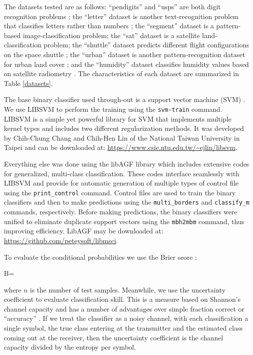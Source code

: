 The datasets tested are as follows: 
``pendigits'' and ``usps'' are both digit recognition problems 
\citep{Alimoglu1996,Hull1994};
the ``letter'' dataset is another text-recognition problem 
that classifies letters rather than numbers 
\citep{Frey_Slate1991};
the ``segment'' dataset is a pattern-based image-classification problem;
the ``sat'' dataset is a satellite land-classification problem;
the ``shuttle'' dataset predicts different flight configurations on the
space shuttle \citep{Michie_etal1994,King_etal1995};
the ``urban'' dataset is another pattern-recognition dataset for urban land cover
\citep{Johnson2013};
and the ``humidity'' dataset classifies humidity values based on satellite
radiometry \citep{Mills2009}.
The characteristics of each dataset are summarized in Table \ref{datasets}.

The base binary classifier used through-out is a 
support vector machine (SVM) \citep{Mueller_etal2001}.
We use LIBSVM \citep{Chang_Lin2011} to perform the training
using the \verb/svm-train/ command.
LIBSVM is a simple yet powerful library for SVM that implements multiple
kernel types and includes two different regularization methods.
It was developed by Chih-Chung Chang and Chih-Hen Lin of the National
Taiwan University in Taipei
and can be downloaded at: \url{https://www.csie.ntu.edu.tw/~cjlin/libsvm}.

Everything else was done using the libAGF library \citep{Mills2011,Mills2018}
which includes extensive codes for generalized, multi-class classification.
These codes interface seamlessly with LIBSVM and provide for automatic
generation of multiple types of control file using the \verb/print_control/
command.
Control files are used to train the binary classifiers and then
to make predictions using the \verb/multi_borders/ and \verb/classify_m/
commands, respectively.
Before making predictions, the binary classifiers were unified to eliminate
duplicate support vectors using the \verb/mbh2mbm/ command, thus improving
efficiency.
LibAGF may be downloaded at: \url{https://github.com/peteysoft/libmsci}.

To evaluate the conditional probabilities we use the Brier score
\citep{Brier1950,Jolliffe_Stephenson2003}:
\begin{eqnnon}
B=
\end{eqnnon}
where $n$ is the number of test samples.
Meanwhile, we use the uncertainty coefficient to evaluate classification skill.
This is a measure based on Shannon's channel capacity \citep{Shannon} and
has a number of advantages over simple fraction correct or ``accuracy''
\citep{Press_etal1992,Mills2011}.
If we treat the classifier as a noisy channel, with each classification a
single symbol, the true class entering at the transmitter and the estimated
class coming out at the receiver,
then the uncertainty coefficient is the channel capacity divided by the
entropy per symbol.


